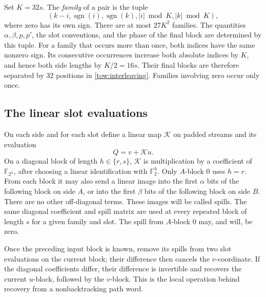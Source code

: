 Set \(K=32s\).  The \emph{family} of a pair is the tuple
\[
 (k-i,\operatorname{sgn}(i),\operatorname{sgn}(k),
                  |i|\bmod K,|k|\bmod K),
\]
where zero has its own sign.  There are at most \(27K^2\) families.
The quantities \(\alpha,\beta,p,p'\), the slot conventions, and the
phase of the final block are determined by this tuple.  For a family
that occurs more than once, both indices have the same nonzero sign.
Its consecutive occurrences increase both absolute indices by \(K\),
and hence both side lengths by \(K/2=16s\).  Their final blocks are
therefore separated by \(32\) positions in
\eqref{tow:interleaving}.  Families involving zero occur only once.

\subsection{The linear slot evaluations}

On each side and for each slot define a linear map \(\mathcal K\) on
padded streams and its evaluation
\begin{equation}
 Q=v+\mathcal K u.
 \label{tow:evaluation}
\end{equation}
On a diagonal block of length \(h\in\{r,s\}\), \(\mathcal K\)
is multiplication by a coefficient of \(\mathbb F _{2^h}\), after
choosing a linear identification with \(\mathbb F _2^h\).  Only
\(A\)-block \(0\) uses \(h=r\).  From each block it may also send a
linear image into the first \(\alpha\) bits of the following block
on side \(A\), or into the first \(\beta\) bits of the following
block on side \(B\).  There are no other off-diagonal terms.  These
images will be called spills.  The same diagonal coefficient and spill
matrix are used at every repeated block of length \(s\) for a given
family and slot.  The spill from \(A\)-block \(0\) may, and will, be
zero.

Once the preceding input block is known, remove its spills from two slot
evaluations on the current block; their difference then cancels the
\(v\)-coordinate.
If the diagonal coefficients differ, their difference is invertible and
recovers the current \(u\)-block, followed by the \(v\)-block.  This is
the local operation behind recovery from a nonbacktracking path word.

